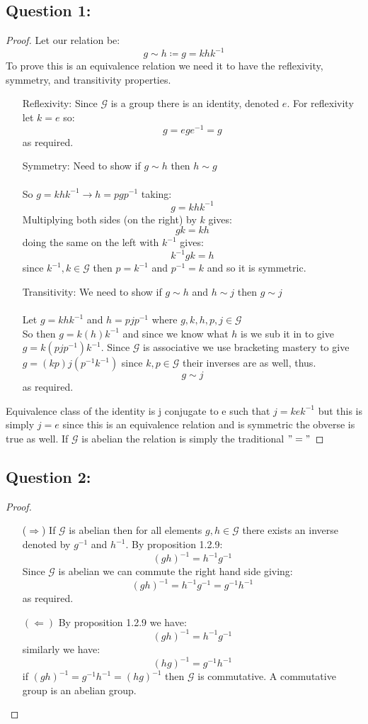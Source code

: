 \documentclass[12pt]{article}
\begin{document}
	\subsection*{Question 1:}
	\begin{proof}
		Let our relation be:
		\[g\sim h \coloneqq g=khk^{-1}\]
		To prove this is an equivalence relation we need it to have the reflexivity, symmetry, and transitivity properties.
		\begin{enumerate}	
			
			\item [Reflexivity:]
			Since $\mathcal{G}$ is a group there is an identity, denoted $e$. For reflexivity let $k=e$ so:
			\[g=ege^{-1}=g\] as required.
			\item [Symmetry:]
			Need to show if $g\sim h$ then $h\sim g$\\ \\
			So $g=khk^{-1}\rightarrow h=pgp^{-1}$ taking:
			\[g=khk^{-1} \]
			Multiplying both sides (on the right) by $k$ gives:
			$$gk=kh$$
			doing the same on the left with $k^{-1}$ gives:
			$$k^{-1}gk=h$$ since $k^{-1},k\in\mathcal{G}$ then $p=k^{-1}$ and $p^{-1}=k$ and so it is symmetric.
			\item [Transitivity:] We need to show if $g\sim h$ and $h\sim j$ then $g\sim j$\\ \\
			Let $g=khk^{-1}$ and $h=pjp^{-1}$ where $g,k,h,p,j\in\mathcal{G}$\\
			So then $g=k(h)k^{-1}$ and since we know what $h$ is we sub it in to give $g=k(pjp^{-1})k^{-1}$. Since $\mathcal{G}$ is associative we use bracketing mastery to give $g=(kp)j(p^{-1}k^{-1})$ since $k,p\in\mathcal{G}$ their inverses are as well, thus. 
			$$g\sim j$$
			as required.
		\end{enumerate}
		Equivalence class of the identity is j conjugate to e such that $j=kek^{-1}$
		but this is simply $j=e$ since this is an equivalence relation and is symmetric the obverse is true as well. If $\mathcal{G}$ is abelian the relation is simply the traditional $"="$
	\end{proof}
\newpage
	\setlength{\headheight}{5pt}
	\fancyhead[R]{}
	\subsection*{Question 2:}
	\begin{proof}
		\begin{enumerate}
			\item[($\Rightarrow$)] If $\mathcal{G}$ is abelian then for all elements $g,h\in\mathcal{G}$ there exists an inverse denoted by $g^{-1}$ and $h^{-1}$. By proposition 1.2.9:
			$$(gh)^{-1}=h^{-1}g^{-1}$$
			Since $\mathcal{G}$ is abelian we can commute the right hand side giving:
			$$(gh)^{-1}=h^{-1}g^{-1}=g^{-1}h^{-1}$$
			as required.
			\item[$(\Leftarrow)$] By proposition 1.2.9 we have:
			$$(gh)^{-1}=h^{-1}g^{-1}$$
			similarly we have:
			$$(hg)^{-1}=g^{-1}h^{-1}$$
			if $(gh)^{-1}=g^{-1}h^{-1}=(hg)^{-1}$ then $\mathcal{G}$ is commutative. A commutative group is an abelian group.
		\end{enumerate}	
	\end{proof}
	\newpage
\end{document}
